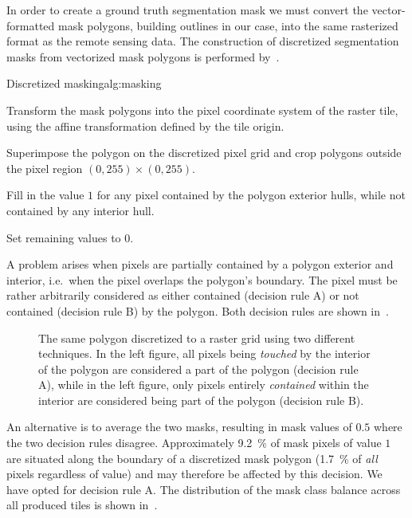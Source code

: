 In order to create a ground truth segmentation mask we must convert the vector-formatted mask polygons, building outlines in our case, into the same rasterized format as the remote sensing data.
The construction of discretized segmentation masks from vectorized mask polygons is performed by~.

\begin{algorithm}{Discretized masking}{alg:masking}
  \item Transform the mask polygons into the pixel coordinate system of the raster tile, using the affine transformation defined by the tile origin.
  \item Superimpose the polygon on the discretized pixel grid and crop polygons outside the pixel region $(0, 255) \times (0, 255)$.
  \item Fill in the value $1$ for any pixel contained by the polygon exterior hulls, while not contained by any interior hull.
  \item Set remaining values to $0$.
\end{algorithm}

A problem arises when pixels are partially contained by a polygon exterior and interior, i.e.\ when the pixel overlaps the polygon's boundary.
The pixel must be rather arbitrarily considered as either contained (decision rule A) or not contained (decision rule B) by the polygon.
Both decision rules are shown in~.

\begin{figure}[H]
  \centering
  
  \hspace{2em}
  
  \caption{%
    The same polygon discretized to a raster grid using two different techniques.
    In the left figure, all pixels being \textit{touched} by the interior of the polygon
    are considered a part of the polygon (decision rule A), while in the left figure, only pixels
    entirely \textit{contained} within the interior are considered being part
    of the polygon (decision rule B).
  }%
  \label{fig:pixel-containment}
\end{figure}

An alternative is to average the two masks, resulting in mask values of $0.5$ where the two decision rules disagree.
Approximately \SI{9.2}{\percent} of mask pixels of value $1$ are situated along the boundary of a discretized mask polygon (\SI{1.7}{\percent} of \textit{all} pixels regardless of value) and may therefore be affected by this decision.
We have opted for decision rule A.
The distribution of the mask class balance across all produced tiles is shown in~.

